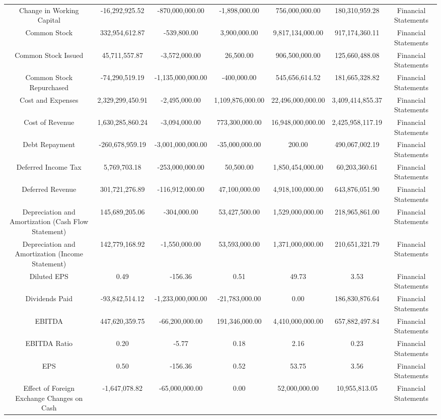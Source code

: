\begin{longtable}{ccccccc}
Change in Working Capital & -16,292,925.52 & -870,000,000.00 & -1,898,000.00 & 756,000,000.00 & 180,310,959.28 & Financial Statements \\
Common Stock & 332,954,612.87 & -539,800.00 & 3,900,000.00 & 9,817,134,000.00 & 917,174,360.11 & Financial Statements \\
Common Stock Issued & 45,711,557.87 & -3,572,000.00 & 26,500.00 & 906,500,000.00 & 125,660,488.08 & Financial Statements \\
Common Stock Repurchased & -74,290,519.19 & -1,135,000,000.00 & -400,000.00 & 545,656,614.52 & 181,665,328.82 & Financial Statements \\
Cost and Expenses & 2,329,299,450.91 & -2,495,000.00 & 1,109,876,000.00 & 22,496,000,000.00 & 3,409,414,855.37 & Financial Statements \\
Cost of Revenue & 1,630,285,860.24 & -3,094,000.00 & 773,300,000.00 & 16,948,000,000.00 & 2,425,958,117.19 & Financial Statements \\
Debt Repayment & -260,678,959.19 & -3,001,000,000.00 & -35,000,000.00 & 200.00 & 490,067,002.19 & Financial Statements \\
Deferred Income Tax & 5,769,703.18 & -253,000,000.00 & 50,500.00 & 1,850,454,000.00 & 60,203,360.61 & Financial Statements \\
Deferred Revenue & 301,721,276.89 & -116,912,000.00 & 47,100,000.00 & 4,918,100,000.00 & 643,876,051.90 & Financial Statements \\
Depreciation and Amortization (Cash Flow Statement) & 145,689,205.06 & -304,000.00 & 53,427,500.00 & 1,529,000,000.00 & 218,965,861.00 & Financial Statements \\
Depreciation and Amortization (Income Statement) & 142,779,168.92 & -1,550,000.00 & 53,593,000.00 & 1,371,000,000.00 & 210,651,321.79 & Financial Statements \\
Diluted EPS & 0.49 & -156.36 & 0.51 & 49.73 & 3.53 & Financial Statements \\
Dividends Paid & -93,842,514.12 & -1,233,000,000.00 & -21,783,000.00 & 0.00 & 186,830,876.64 & Financial Statements \\
EBITDA & 447,620,359.75 & -66,200,000.00 & 191,346,000.00 & 4,410,000,000.00 & 657,882,497.84 & Financial Statements \\
EBITDA Ratio & 0.20 & -5.77 & 0.18 & 2.16 & 0.23 & Financial Statements \\
EPS & 0.50 & -156.36 & 0.52 & 53.75 & 3.56 & Financial Statements \\
Effect of Foreign Exchange Changes on Cash & -1,647,078.82 & -65,000,000.00 & 0.00 & 52,000,000.00 & 10,955,813.05 & Financial Statements \\

\end{longtable}

